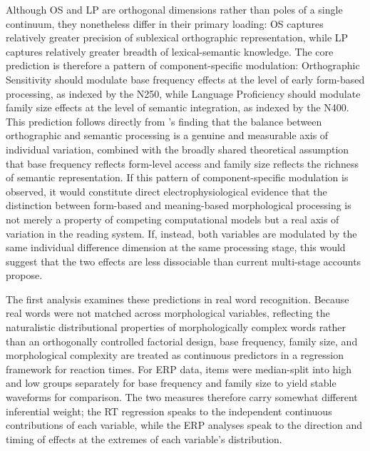 \documentclass[utf8]{FrontiersinHarvard} %
\begin{document}
	Although OS and LP are orthogonal dimensions rather than poles of a single continuum, they nonetheless differ in their primary loading: OS captures relatively greater precision of sublexical orthographic representation, while LP captures relatively greater breadth of lexical-semantic knowledge. The core prediction is therefore a pattern of component-specific modulation: Orthographic Sensitivity should modulate base frequency effects at the level of early form-based processing, as indexed by the N250, while Language Proficiency should modulate family size effects at the level of semantic integration, as indexed by the N400. This prediction follows directly from \citeauthor{andrewsMorphologicalPrimingStronger2013}'s \citeyearpar{andrewsMorphologicalPrimingStronger2013} finding that the balance between orthographic and semantic processing is a genuine and measurable axis of individual variation, combined with the broadly shared theoretical assumption that base frequency reflects form-level access and family size reflects the richness of semantic representation. If this pattern of component-specific modulation is observed, it would constitute direct electrophysiological evidence that the distinction between form-based and meaning-based morphological processing is not merely a property of competing computational models but a real axis of variation in the reading system. If, instead, both variables are modulated by the same individual difference dimension at the same processing stage, this would suggest that the two effects are less dissociable than current multi-stage accounts propose.
	
	The first analysis examines these predictions in real word recognition. Because real words were not matched across morphological variables, reflecting the naturalistic distributional properties of morphologically complex words rather than an orthogonally controlled factorial design, base frequency, family size, and morphological complexity are treated as continuous predictors in a regression framework for reaction times. For ERP data, items were median-split into high and low groups separately for base frequency and family size to yield stable waveforms for comparison. The two measures therefore carry somewhat different inferential weight; the RT regression speaks to the independent continuous contributions of each variable, while the ERP analyses speak to the direction and timing of effects at the extremes of each variable's distribution.
	
\end{document}
